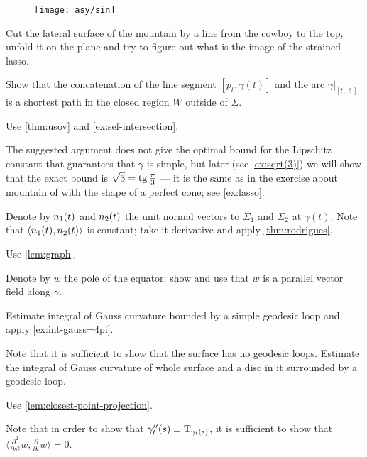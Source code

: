 \begin{figure}[h!]
\vskip-0mm
\centering
\texttt{[image: asy/sin]}
\vskip-0mm
\end{figure}

 Cut the lateral surface of the mountain by a line from the cowboy to the top, unfold it on the plane and try to figure out what is the image of the strained lasso.

 Show that the concatenation of the line segment $[p_t,\gamma(t)]$ and the arc $\gamma|_{[t,\ell]}$ is a shortest path in the closed region $W$ outside of $\Sigma$.

 Use \ref{thm:usov} and \ref{ex:sef-intersection}.

The suggested argument does not give the optimal bound for the Lipschitz constant that guarantees that $\gamma$ is simple, but
later (see \ref{ex:sqrt(3)}) we will show that the exact bound is $\sqrt{3}=\operatorname{tg}\tfrac\pi3$ --- it is the same as in the exercise about mountain of with the shape of a perfect cone; see \ref{ex:lasso}.

  Denote by $n_1(t)$ and $n_2(t)$ the unit normal vectors to $\Sigma_1$ and $\Sigma_2$ at $\gamma(t)$.
Note that $\langle n_1(t),n_2(t)\rangle$ is constant; take it derivative and apply \ref{thm:rodrigues}.

 Use \ref{lem:graph}.

 Denote by $w$ the pole of the equator; show and use that $w$ is a parallel vector field along $\gamma$.

 Estimate integral of Gauss curvature bounded by a simple geodesic loop and apply \ref{ex:int-gauss=4pi}.

 Note that it is sufficient to show that the surface has no geodesic loops.
Estimate the integral of Gauss curvature of whole surface and a disc in it surrounded by a geodesic loop.



 Use \ref{lem:closest-point-projection}.



 Note that in order to show that $\gamma''_t(s)\perp\mathrm{T}_{\gamma_t(s)}$, it is sufficient to show that $\langle\tfrac{\partial^2}{\partial s^2}w,\tfrac{\partial}{\partial t}w\rangle=0$.






